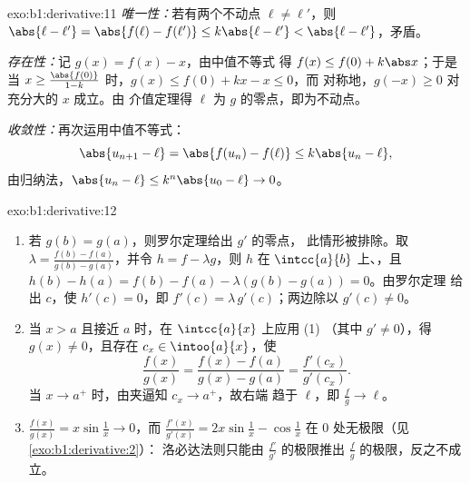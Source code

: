 \begin{solution}{exo:b1:derivative:11}
\emph{唯一性：}若有两个不动点 $\ell \neq \ell'$，则
$\abs{\ell - \ell'} = \abs{f(\ell) - f(\ell')} \leq k\abs{\ell -
\ell'} < \abs{\ell - \ell'}$，矛盾。

\emph{存在性：}记 $g(x) = f(x) - x$，由中值不等式
得 $f(x) \leq f(0) + k\abs x$；于是当 $x \geq
\frac{\abs{f(0)}}{1 - k}$ 时，$g(x) \leq f(0) + kx - x \leq 0$，而
对称地，$g(-x) \geq 0$ 对充分大的 $x$ 成立。由
介值定理得 $\ell$ 为 $g$ 的零点，即为不动点。

\emph{收敛性：}再次运用中值不等式：
\[
\abs{u_{n+1} - \ell} = \abs{f(u_n) - f(\ell)} \leq k\abs{u_n - \ell},
\]
由归纳法，$\abs{u_n - \ell} \leq k^n \abs{u_0 - \ell} \to 0$。
\end{solution}

\begin{solution}{exo:b1:derivative:12}
\begin{enumerate}
  \item 若 $g(b) = g(a)$，则罗尔定理给出 $g'$ 的零点，
        此情形被排除。取 $\lambda = \frac{f(b) - f(a)}{g(b) -
        g(a)}$，并令 $h = f - \lambda g$，则 $h$ 在
        $\intcc{a}{b}$ 上、，且 $h(b) - h(a)
        = f(b) - f(a) - \lambda(g(b) - g(a)) = 0$。由罗尔定理
        给出 $c$，使 $h'(c) = 0$，即 $f'(c) =
        \lambda\,g'(c)$；两边除以 $g'(c) \neq 0$。
  \item 当 $x > a$ 且接近 $a$ 时，在 $\intcc{a}{x}$ 上应用 (1)
        （其中 $g' \neq 0$），得 $g(x) \neq 0$，且存在 $c_x \in
        \intoo{a}{x}$，使
        \[
        \frac{f(x)}{g(x)} = \frac{f(x) - f(a)}{g(x) - g(a)}
        = \frac{f'(c_x)}{g'(c_x)} .
        \]
        当 $x \to a^+$ 时，由夹逼知 $c_x \to a^+$，故右端
        趋于 $\ell$，即 $\frac{f}{g} \to \ell$。
  \item $\frac{f(x)}{g(x)} = x\sin\frac1x \to 0$，而
        $\frac{f'(x)}{g'(x)} = 2x\sin\frac1x - \cos\frac1x$ 在
        $0$ 处无极限（见\cref{exo:b1:derivative:2}）：
        洛必达法则只能由
        $\frac{f'}{g'}$ 的极限推出 $\frac fg$ 的极限，反之不成立。
\end{enumerate}
\end{solution}

